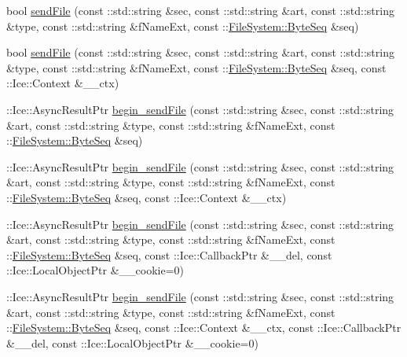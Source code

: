 \begin{DoxyCompactItemize}
\item 
bool \hyperlink{class_ice_proxy_1_1_file_system_1_1_file_ab3708aa9ebb1399ce32a9507d925215d}{send\+File} (const \+::std\+::string \&sec, const \+::std\+::string \&art, const \+::std\+::string \&type, const \+::std\+::string \&f\+Name\+Ext, const \+::\hyperlink{namespace_file_system_a5c85de065f9c451ae1d1dea2dacb68c5}{File\+System\+::\+Byte\+Seq} \&seq)
\item 
bool \hyperlink{class_ice_proxy_1_1_file_system_1_1_file_a8d7b147b0f1542786a5be6e6c9f0d45a}{send\+File} (const \+::std\+::string \&sec, const \+::std\+::string \&art, const \+::std\+::string \&type, const \+::std\+::string \&f\+Name\+Ext, const \+::\hyperlink{namespace_file_system_a5c85de065f9c451ae1d1dea2dacb68c5}{File\+System\+::\+Byte\+Seq} \&seq, const \+::Ice\+::\+Context \&\+\_\+\+\_\+ctx)
\item 
\+::Ice\+::\+Async\+Result\+Ptr \hyperlink{class_ice_proxy_1_1_file_system_1_1_file_a713d1ca52a1c93ea3f2a6d8a26db6e83}{begin\+\_\+send\+File} (const \+::std\+::string \&sec, const \+::std\+::string \&art, const \+::std\+::string \&type, const \+::std\+::string \&f\+Name\+Ext, const \+::\hyperlink{namespace_file_system_a5c85de065f9c451ae1d1dea2dacb68c5}{File\+System\+::\+Byte\+Seq} \&seq)
\item 
\+::Ice\+::\+Async\+Result\+Ptr \hyperlink{class_ice_proxy_1_1_file_system_1_1_file_aaa9a30cd6344bb689d0aee77984be5d0}{begin\+\_\+send\+File} (const \+::std\+::string \&sec, const \+::std\+::string \&art, const \+::std\+::string \&type, const \+::std\+::string \&f\+Name\+Ext, const \+::\hyperlink{namespace_file_system_a5c85de065f9c451ae1d1dea2dacb68c5}{File\+System\+::\+Byte\+Seq} \&seq, const \+::Ice\+::\+Context \&\+\_\+\+\_\+ctx)
\item 
\+::Ice\+::\+Async\+Result\+Ptr \hyperlink{class_ice_proxy_1_1_file_system_1_1_file_a041ae45fbe56672712fc96545dab9e3a}{begin\+\_\+send\+File} (const \+::std\+::string \&sec, const \+::std\+::string \&art, const \+::std\+::string \&type, const \+::std\+::string \&f\+Name\+Ext, const \+::\hyperlink{namespace_file_system_a5c85de065f9c451ae1d1dea2dacb68c5}{File\+System\+::\+Byte\+Seq} \&seq, const \+::Ice\+::\+Callback\+Ptr \&\+\_\+\+\_\+del, const \+::Ice\+::\+Local\+Object\+Ptr \&\+\_\+\+\_\+cookie=0)
\item 
\+::Ice\+::\+Async\+Result\+Ptr \hyperlink{class_ice_proxy_1_1_file_system_1_1_file_a3f52adcc4284d6c31f9d51e69259b4b0}{begin\+\_\+send\+File} (const \+::std\+::string \&sec, const \+::std\+::string \&art, const \+::std\+::string \&type, const \+::std\+::string \&f\+Name\+Ext, const \+::\hyperlink{namespace_file_system_a5c85de065f9c451ae1d1dea2dacb68c5}{File\+System\+::\+Byte\+Seq} \&seq, const \+::Ice\+::\+Context \&\+\_\+\+\_\+ctx, const \+::Ice\+::\+Callback\+Ptr \&\+\_\+\+\_\+del, const \+::Ice\+::\+Local\+Object\+Ptr \&\+\_\+\+\_\+cookie=0)

\end{DoxyCompactItemize}
